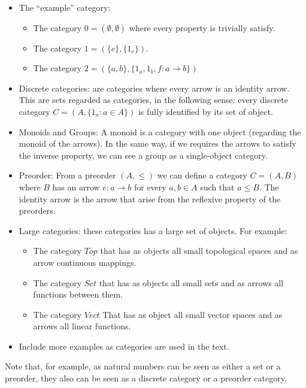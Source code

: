 \begin{itemize}
\item The ``example'' category:
  \begin{itemize}
  \item The category $0 = ( \emptyset, \emptyset)$ where every property is trivially satisfy.
  \item The category $1 = (\{e\},\{1_e\})$.
  \item The category $2 = (\{a,b\},\{1_a,1_b,f:a\to b\})$
  \end{itemize}

\item Discrete categories: are categories where every arrow is an identity arrow. This are sets regarded as categories, in the following sense: every discrete category $C=(A, \{1_a : a \in A\})$ is fully identified by its set of object.  
\item Monoids and Groups: A monoid is a category with one object (regarding the monoid of the arrows). In the same way, if we requires the arrows to satisfy the inverse property, we can see a group as a single-object category. 
\item Preorder: From a preorder $(A, \le)$ we can define a category $C = (A, B)$ where $B$ has an arrow $e: a \to b$ for every $a,b\in A$ such that $a \le B$. The identity arrow is the arrow that arise from the reflexive property of the preorders. 

\item Large categories: these categories has a large set of objects. For example:
  \begin{itemize}
\item The category $Top$ that has as objects all small topological spaces and as arrow continuous mappings.
\item The category $Set$ that has as objects all small sets and as arrows all functions between them.
\item The category $Vect$ That has as object all small vector spaces and as arrows all linear functions.
\end{itemize}

\item Include more examples as categories are used in the text.
\end{itemize}

Note that, for example,  as natural numbers can be seen as either a set or a preorder, they also can be seen as a discrete category or a preorder category.




